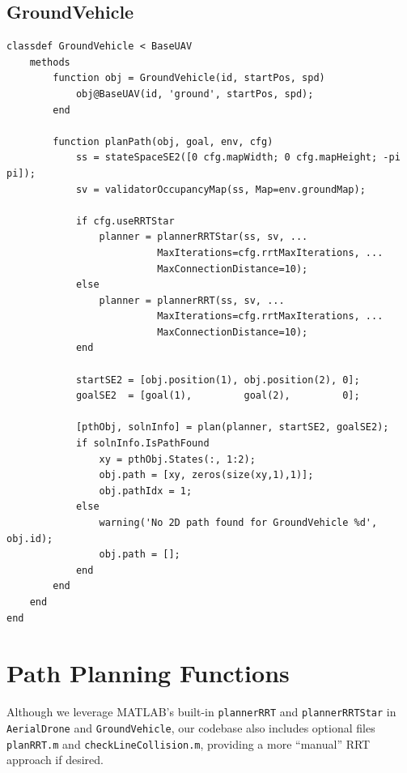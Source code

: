 \documentclass[12pt,a4paper]{report}
\begin{document}
\subsection{GroundVehicle}
\label{sec:ground_vehicle_code}
\begin{verbatim}
classdef GroundVehicle < BaseUAV
    methods
        function obj = GroundVehicle(id, startPos, spd)
            obj@BaseUAV(id, 'ground', startPos, spd);
        end

        function planPath(obj, goal, env, cfg)
            ss = stateSpaceSE2([0 cfg.mapWidth; 0 cfg.mapHeight; -pi pi]);
            sv = validatorOccupancyMap(ss, Map=env.groundMap);

            if cfg.useRRTStar
                planner = plannerRRTStar(ss, sv, ...
                          MaxIterations=cfg.rrtMaxIterations, ...
                          MaxConnectionDistance=10);
            else
                planner = plannerRRT(ss, sv, ...
                          MaxIterations=cfg.rrtMaxIterations, ...
                          MaxConnectionDistance=10);
            end

            startSE2 = [obj.position(1), obj.position(2), 0];
            goalSE2  = [goal(1),         goal(2),         0];

            [pthObj, solnInfo] = plan(planner, startSE2, goalSE2);
            if solnInfo.IsPathFound
                xy = pthObj.States(:, 1:2);
                obj.path = [xy, zeros(size(xy,1),1)];
                obj.pathIdx = 1;
            else
                warning('No 2D path found for GroundVehicle %d', obj.id);
                obj.path = [];
            end
        end
    end
end
\end{verbatim}

\section{Path Planning Functions}
\label{sec:path_planning}
Although we leverage MATLAB's built-in \texttt{plannerRRT} and \texttt{plannerRRTStar}
in \texttt{AerialDrone} and \texttt{GroundVehicle}, our codebase also includes optional
files \texttt{planRRT.m} and \texttt{checkLineCollision.m}, providing a more
“manual” RRT approach if desired.
\end{document}
